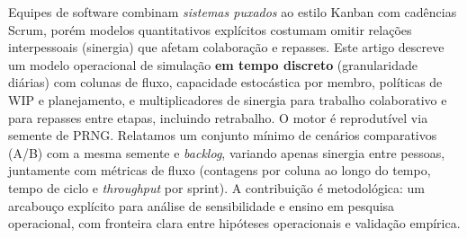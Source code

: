 Equipes de software combinam \emph{sistemas puxados} ao estilo Kanban com cadências Scrum, porém modelos quantitativos explícitos costumam omitir relações interpessoais (sinergia) que afetam colaboração e repasses. Este artigo descreve um modelo operacional de simulação \textbf{em tempo discreto} (granularidade diárias) com colunas de fluxo, capacidade estocástica por membro, políticas de WIP e planejamento, e multiplicadores de sinergia para trabalho colaborativo e para repasses entre etapas, incluindo retrabalho. O motor é reprodutível via semente de PRNG. Relatamos um conjunto mínimo de cenários comparativos (A/B) com a mesma semente e \emph{backlog}, variando apenas sinergia entre pessoas, juntamente com métricas de fluxo (contagens por coluna ao longo do tempo, tempo de ciclo e \emph{throughput} por sprint). A contribuição é metodológica: um arcabouço explícito para análise de sensibilidade e ensino em pesquisa operacional, com fronteira clara entre hipóteses operacionais e validação empírica.
